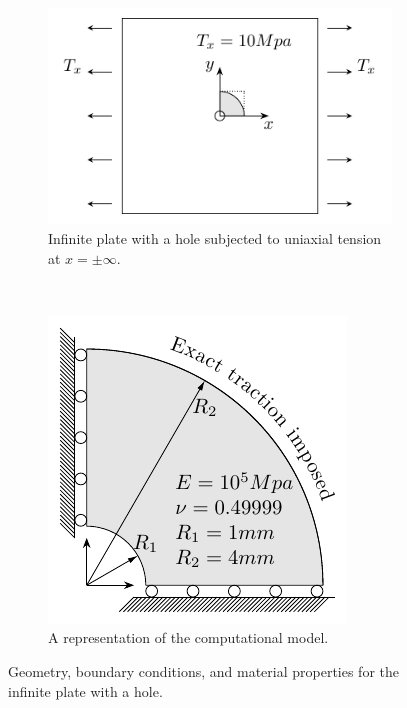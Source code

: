 \documentclass{article}
\begin{document}
\begin{figure}[htb!]
	\centering
	\begin{subfigure}[t]{0.5\textwidth}
    \centering
    \includegraphics[width=1\linewidth]{Platewithhole}
    \caption{Infinite plate with a hole subjected to uniaxial tension at $x=\pm\infty$.}
    \label{fig:platewithhole_geometry_a}
    \end{subfigure}%
    ~ 
    \begin{subfigure}[t]{0.5\textwidth}
    \centering
    \includegraphics[width=1\linewidth]{Platewithhole_b}
    \caption{A representation of the computational model.}
    \label{fig:platewithhole_geometry_b}
    \end{subfigure}
    \caption{Geometry, boundary conditions, and material properties for the infinite plate with a hole.}
	\label{fig:platewithhole_geometry}
\end{figure}
\end{document}
